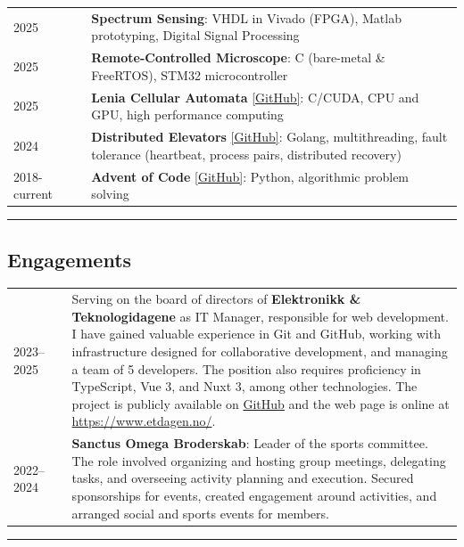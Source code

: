 \documentclass[10pt]{article}
\newlength{\cw}
\newlength{\cwl}
\begin{document}
\begin{tabular}{p{\cw} @{:}l p{\cwl}}
  2025 & & \textbf{Spectrum Sensing}: 
  VHDL in Vivado (FPGA), Matlab prototyping, Digital Signal Processing \\

  2025 & & \textbf{Remote-Controlled Microscope}:
  C (bare-metal \& FreeRTOS), STM32 microcontroller \\

  2025 & & \textbf{Lenia Cellular Automata} \href{https://github.com/PederIngmar/lenia-simulation}{[GitHub]}: 
  C/CUDA, CPU and GPU, high performance computing \\

  2024 & & \textbf{Distributed Elevators} \href{https://github.com/PederIngmar/distributed-elevators}{[GitHub]}: 
  Golang, multithreading, fault tolerance (heartbeat, process pairs, distributed recovery) \\


  2018-current & & \textbf{Advent of Code} \href{https://github.com/PederIngmar/AdventOfCode}{[GitHub]}: 
  Python, algorithmic problem solving
\end{tabular}

\vspace{0.1cm}
\hrule
\vspace{0.1cm}

\subsection*{Engagements}
\begin{tabular}{p{\cw} @{:}l p{\cwl}}
  2023--2025 & & Serving on the board of directors of \textbf{Elektronikk \& Teknologidagene} as IT Manager, responsible for web development.
  I have gained valuable experience in Git and GitHub, working with infrastructure designed for collaborative development, and managing a team of 5 developers.
  The position also requires proficiency in TypeScript, Vue 3, and Nuxt 3, among other technologies.
  The project is publicly available on \href{https://github.com/et-dagen}{GitHub} and the web page is online at \href{https://www.etdagen.no/}{https://www.etdagen.no/}.
  \\
  2022--2024 & & \textbf{Sanctus Omega Broderskab}: Leader of the sports committee. The role involved organizing and hosting group meetings, 
  delegating tasks, and overseeing activity planning and execution. 
  Secured sponsorships for events, created engagement around activities, and arranged social and sports events for members. \\
\end{tabular}
\vspace{0.1cm}
\hrule
\vspace{0.1cm}
\end{document}

